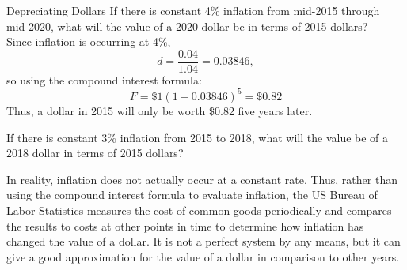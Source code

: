 \begin{example}[https://www.youtube.com/watch?v=bNXuphP1Yc4]{Depreciating Dollars}
If there is constant 4\% inflation from mid-2015 through mid-2020, what will the value of a 2020 dollar be in terms of 2015 dollars?\\

Since inflation is occurring at 4\%, \[d=\dfrac{0.04}{1.04} = 0.03846,\] so using the compound interest formula: 
\[F=\$1(1-0.03846)^5 = \$0.82\]  Thus, a dollar in 2015 will only be worth \$0.82 five years later.
\end{example}

\begin{try}
If there is constant 3\% inflation from 2015 to 2018, what will the value be of a 2018 dollar in terms of 2015 dollars?
\end{try}

In reality, inflation does not actually occur at a constant rate.  Thus, rather than using the compound interest formula to evaluate inflation, the US Bureau of Labor Statistics measures the cost of common goods periodically and compares the results to costs at other points in time to determine how inflation has changed the value of a dollar.  It is not a perfect system by any means, but it can give a good approximation for the value of a dollar in comparison to other years.

